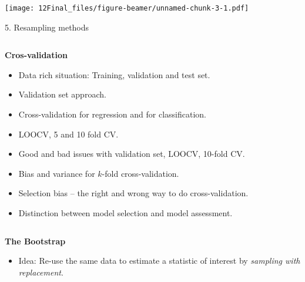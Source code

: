 \documentclass[10pt,ignorenonframetext,]{beamer}
\providecommand{\tightlist}{%
  \setlength{\itemsep}{0pt}\setlength{\parskip}{0pt}}
\begin{document}
\begin{frame}

\texttt{[image: 12Final\_files/figure-beamer/unnamed-chunk-3-1.pdf]}

\end{frame}

\begin{frame}

\begin{block}{5. Resampling methods}

\(~\)

\textbf{Cros-validation}

\vspace{2mm}

\begin{itemize}
\item
  Data rich situation: Training, validation and test set. \vspace{2mm}
\item
  Validation set approach. \vspace{2mm}
\item
  Cross-validation for regression and for classification. \vspace{2mm}
\item
  LOOCV, 5 and 10 fold CV. \vspace{2mm}
\item
  Good and bad issues with validation set, LOOCV, 10-fold CV.
  \vspace{2mm}
\item
  Bias and variance for \(k\)-fold cross-validation. \vspace{2mm}
\item
  Selection bias -- the right and wrong way to do cross-validation.
  \vspace{2mm}
\item
  Distinction between model selection and model assessment.
\end{itemize}

\(~\)

\textbf{The Bootstrap}

\begin{itemize}
\tightlist
\item
  Idea: Re-use the same data to estimate a statistic of interest by
  \emph{sampling with replacement}.
\end{itemize}

\end{block}

\end{frame}
\end{document}
